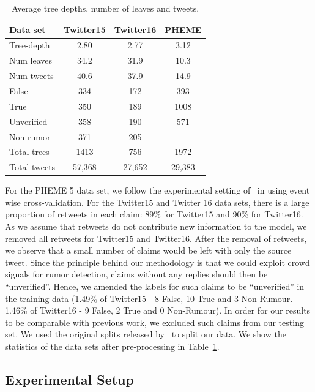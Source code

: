 \documentclass[letterpaper]{article} %
\begin{document}
\begin{table}
\centering
\small
\begin{tabular}{lccc} \toprule
Data set    & Twitter15 & Twitter16 & PHEME \\ \midrule
Tree-depth  & 2.80      & 2.77      & 3.12  \\
Num leaves  & 34.2      & 31.9      & 10.3  \\
Num tweets  & 40.6      & 37.9      & 14.9  \\
False       & 334       & 172       & 393 \\
True        & 350       & 189       & 1008 \\
Unverified  & 358       & 190       & 571 \\
Non-rumor   & 371       & 205       & - \\
Total trees & 1413      & 756       & 1972 \\
Total tweets& 57,368    & 27,652    & 29,383\\
\bottomrule
\end{tabular}
\caption{Average tree depths, number of leaves and tweets.}
\label{tab:data_tree_analysis}
\end{table}

For the PHEME 5 data set, we follow the experimental setting of~\citet{kumar19} in using event wise cross-validation.
For the Twitter15 and Twitter 16 data sets, there is a large proportion of retweets in each claim: 89\% for Twitter15 and 90\% for Twitter16. As we assume that retweets do not contribute new information to the model, we removed all retweets for Twitter15 and Twitter16. After the removal of retweets, we observe that a small number of claims would be left with only the source tweet. Since the principle behind our methodology is that we could exploit crowd signals for rumor detection, claims without any replies should then be ``unverified''. Hence, we amended the labels for such claims to be ``unverified'' in the training data (1.49\% of Twitter15 - 8 False, 10 True and 3 Non-Rumour. 1.46\% of Twitter16 - 9 False, 2 True and 0 Non-Rumour). In order for our results to be comparable with previous work, we excluded such claims from our testing set. We used the original splits released by~\cite{ma18} to split our data.
We show the statistics of the data sets after pre-processing in Table~\ref{tab:data_tree_analysis}.

\subsection{Experimental Setup}
\end{document}
